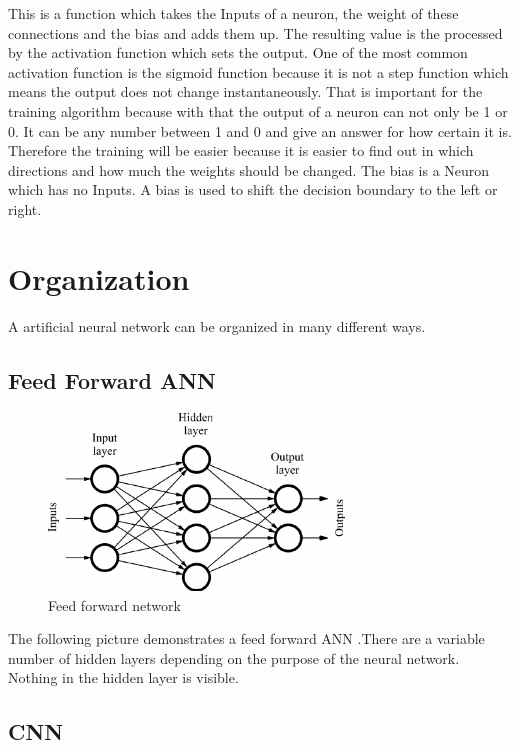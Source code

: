 This is a function which takes the Inputs of a neuron, the weight of these connections and the bias and adds them up. The resulting value is the processed by the activation function which sets the output. One of the most common activation function is the sigmoid function because it is not a step function which means the output does not  change instantaneously. That is important for the training algorithm because with that the output of a neuron can not only be 1 or 0. It can be any number between 1 and 0 and give an answer for how certain it is. Therefore the training will be easier because it is easier to find out in which directions and how much the weights should be changed. The bias is a Neuron which has no Inputs. A bias is used to shift the decision boundary to the left or right.

\section{Organization}

A artificial neural network can be organized in many different ways.

\subsection{Feed Forward ANN}

\begin{figure}[h]
	\centering
	\includegraphics[width=0.7\textwidth]{./media/images/feed_forward_neural_network.png}
  	\caption{Feed forward network}
  	\label{ffNN}
\end{figure}

The following picture demonstrates a feed forward ANN .There are a variable number of hidden layers depending on the purpose of the neural network. Nothing in the hidden layer is visible. 

\subsection{CNN}

